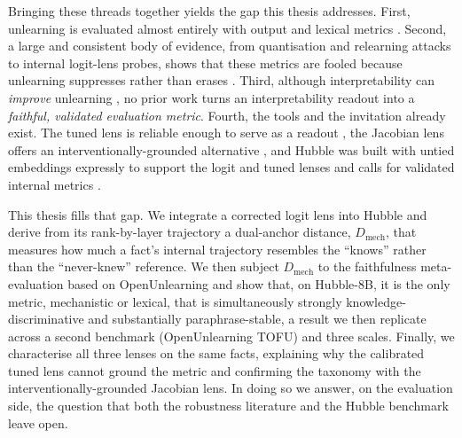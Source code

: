 Bringing these threads together yields the gap this thesis addresses. First, unlearning is evaluated almost
entirely with output and lexical metrics \citep{maini2024tofu,shi2024muse,li2024wmdp,dorna2025openunlearning}.
Second, a large and consistent body of evidence, from quantisation and relearning attacks to internal
logit-lens probes, shows that these metrics are fooled because unlearning suppresses rather than erases
\citep{zhang2024quantization,lynch2024eight,fan2025relearn,thaker2024blackbox,deeb2024weights,
patil2023candelete,semantic2025unlearning}. Third, although interpretability can \emph{improve} unlearning
\citep{guo2024mechanistic,sae2025clamping}, no prior work turns an interpretability readout into a
\emph{faithful, validated evaluation metric}. Fourth, the tools and the invitation already exist. The tuned
lens is reliable enough to serve as a readout \citep{belrose2023tunedlens}, the Jacobian lens offers an
interventionally-grounded alternative \citep{anthropic2026workspace}, and Hubble was built with untied
embeddings expressly to support
the logit and tuned lenses and calls for validated internal metrics \citep{allegro2025hubble}.

This thesis fills that gap. We integrate a corrected logit lens into Hubble and derive from its rank-by-layer
trajectory a dual-anchor distance, \(D_\text{mech}\), that measures how much a fact's internal trajectory
resembles the ``knows'' rather than the ``never-knew'' reference. We then subject \(D_\text{mech}\) to the
faithfulness meta-evaluation based on OpenUnlearning and show that, on Hubble-8B, it is the only metric,
mechanistic or lexical, that is simultaneously strongly knowledge-discriminative and substantially
paraphrase-stable, a result we then replicate across a second benchmark (OpenUnlearning TOFU) and three
scales. Finally, we characterise all three lenses on the same facts, explaining why the calibrated tuned
lens cannot ground the metric and confirming the taxonomy with the interventionally-grounded Jacobian lens.
In doing so we answer, on the evaluation
side, the question that both the robustness literature and the Hubble benchmark leave open.
